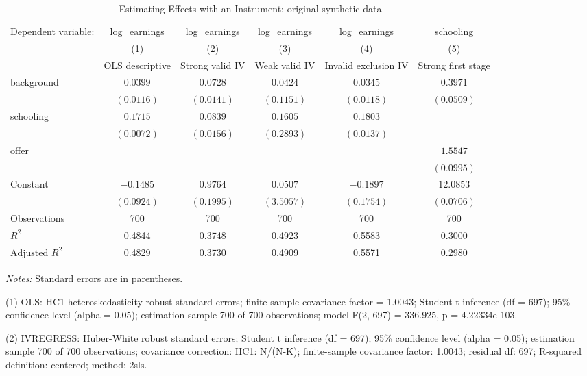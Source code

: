 \begin{table}[htbp]
\centering
\caption{Estimating Effects with an Instrument: original synthetic data}
\label{tab:13-instrumental-variables}
\begingroup
\small
\setlength{\tabcolsep}{6pt}
\renewcommand{\arraystretch}{1.12}
\begin{adjustbox}{max width=\linewidth}
\begin{tabular}{@{}lccccc@{}}
\toprule
Dependent variable: & log\_earnings & log\_earnings & log\_earnings & log\_earnings & schooling \\
 & (1) & (2) & (3) & (4) & (5) \\
 & OLS descriptive & Strong valid IV & Weak valid IV & Invalid exclusion IV & Strong first stage \\
\midrule
background & $0.0399$ & $0.0728$ & $0.0424$ & $0.0345$ & $0.3971$ \\
 & $(0.0116)$ & $(0.0141)$ & $(0.1151)$ & $(0.0118)$ & $(0.0509)$ \\[0.35em]
schooling & $0.1715$ & $0.0839$ & $0.1605$ & $0.1803$ &  \\
 & $(0.0072)$ & $(0.0156)$ & $(0.2893)$ & $(0.0137)$ &  \\[0.35em]
offer &  &  &  &  & $1.5547$ \\
 &  &  &  &  & $(0.0995)$ \\[0.35em]
Constant & $-0.1485$ & $0.9764$ & $0.0507$ & $-0.1897$ & $12.0853$ \\
 & $(0.0924)$ & $(0.1995)$ & $(3.5057)$ & $(0.1754)$ & $(0.0706)$ \\[0.35em]
\midrule
Observations & 700 & 700 & 700 & 700 & 700 \\
$R^{2}$ & 0.4844 & 0.3748 & 0.4923 & 0.5583 & 0.3000 \\
$\text{Adjusted }R^{2}$ & 0.4829 & 0.3730 & 0.4909 & 0.5571 & 0.2980 \\
\bottomrule
\end{tabular}
\end{adjustbox}
\par\smallskip
\begin{minipage}{\linewidth}
\footnotesize
\raggedright
\textit{Notes:} Standard errors are in parentheses.\par
(1) OLS: HC1 heteroskedasticity-robust standard errors; finite-sample covariance factor = 1.0043; Student t inference (df = 697); 95\% confidence level (alpha = 0.05); estimation sample 700 of 700 observations; model F(2, 697) = 336.925, p = 4.22334e-103.\par
(2) IVREGRESS: Huber-White robust standard errors; Student t inference (df = 697); 95\% confidence level (alpha = 0.05); estimation sample 700 of 700 observations; covariance correction: HC1: N/(N-K); finite-sample covariance factor: 1.0043; residual df: 697; R-squared definition: centered; method: 2sls.\par

\end{minipage}
\end{table}
